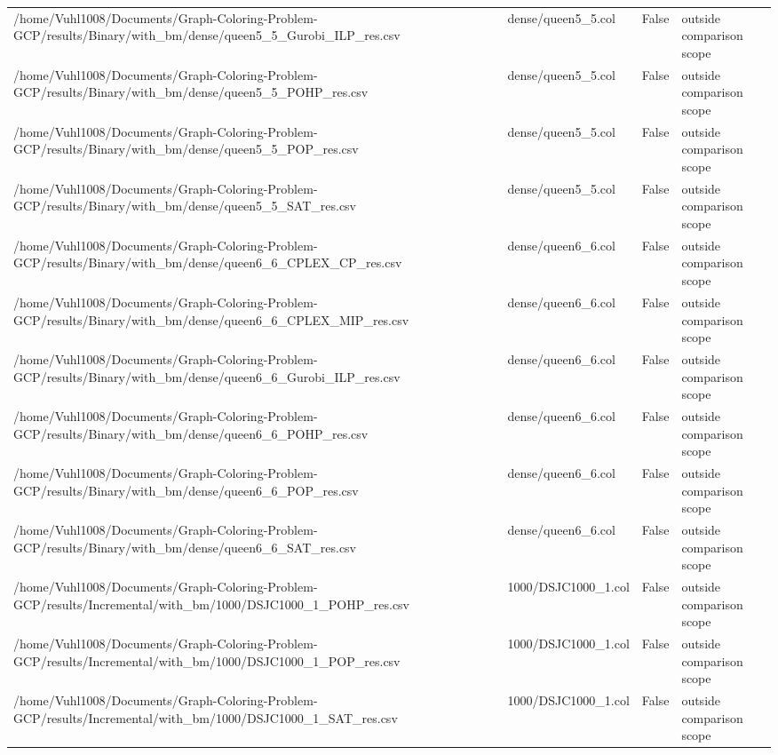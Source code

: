 \begin{table}[htbp]
\begin{tabular}{llll}
/home/Vuhl1008/Documents/Graph-Coloring-Problem-GCP/results/Binary/with\_bm/dense/queen5\_5\_Gurobi\_ILP\_res.csv & dense/queen5\_5.col & False & outside comparison scope \\
/home/Vuhl1008/Documents/Graph-Coloring-Problem-GCP/results/Binary/with\_bm/dense/queen5\_5\_POHP\_res.csv & dense/queen5\_5.col & False & outside comparison scope \\
/home/Vuhl1008/Documents/Graph-Coloring-Problem-GCP/results/Binary/with\_bm/dense/queen5\_5\_POP\_res.csv & dense/queen5\_5.col & False & outside comparison scope \\
/home/Vuhl1008/Documents/Graph-Coloring-Problem-GCP/results/Binary/with\_bm/dense/queen5\_5\_SAT\_res.csv & dense/queen5\_5.col & False & outside comparison scope \\
/home/Vuhl1008/Documents/Graph-Coloring-Problem-GCP/results/Binary/with\_bm/dense/queen6\_6\_CPLEX\_CP\_res.csv & dense/queen6\_6.col & False & outside comparison scope \\
/home/Vuhl1008/Documents/Graph-Coloring-Problem-GCP/results/Binary/with\_bm/dense/queen6\_6\_CPLEX\_MIP\_res.csv & dense/queen6\_6.col & False & outside comparison scope \\
/home/Vuhl1008/Documents/Graph-Coloring-Problem-GCP/results/Binary/with\_bm/dense/queen6\_6\_Gurobi\_ILP\_res.csv & dense/queen6\_6.col & False & outside comparison scope \\
/home/Vuhl1008/Documents/Graph-Coloring-Problem-GCP/results/Binary/with\_bm/dense/queen6\_6\_POHP\_res.csv & dense/queen6\_6.col & False & outside comparison scope \\
/home/Vuhl1008/Documents/Graph-Coloring-Problem-GCP/results/Binary/with\_bm/dense/queen6\_6\_POP\_res.csv & dense/queen6\_6.col & False & outside comparison scope \\
/home/Vuhl1008/Documents/Graph-Coloring-Problem-GCP/results/Binary/with\_bm/dense/queen6\_6\_SAT\_res.csv & dense/queen6\_6.col & False & outside comparison scope \\
/home/Vuhl1008/Documents/Graph-Coloring-Problem-GCP/results/Incremental/with\_bm/1000/DSJC1000\_1\_POHP\_res.csv & 1000/DSJC1000\_1.col & False & outside comparison scope \\
/home/Vuhl1008/Documents/Graph-Coloring-Problem-GCP/results/Incremental/with\_bm/1000/DSJC1000\_1\_POP\_res.csv & 1000/DSJC1000\_1.col & False & outside comparison scope \\
/home/Vuhl1008/Documents/Graph-Coloring-Problem-GCP/results/Incremental/with\_bm/1000/DSJC1000\_1\_SAT\_res.csv & 1000/DSJC1000\_1.col & False & outside comparison scope \\

\end{tabular}
\end{table}
